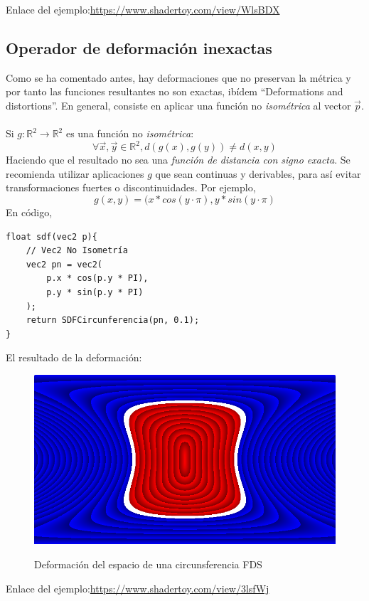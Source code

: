 Enlace del ejemplo:\url{https://www.shadertoy.com/view/WlsBDX}

\subsection{Operador de deformación inexactas}
Como se ha comentado antes, hay deformaciones que no preservan la métrica y por tanto las funciones resultantes no son exactas, ibídem \enquote{Deformations and distortions}. En general, consiste en aplicar una función no \textit{isométrica} al vector \(\Vec{p}\).\\\\
Si \(g:\mathbb{R}^2\longrightarrow \mathbb{R}^2\) es una función no \textit{isométrica}:
\[ \forall \Vec{x}, \Vec{y} \in \mathbb{R}^2, d(g(x), g(y)) \neq d(x,y) \]
Haciendo que el resultado no sea una \textit{función de distancia con signo exacta}. Se recomienda utilizar aplicaciones \(g\) que sean continuas y derivables, para así evitar transformaciones fuertes o discontinuidades. Por ejemplo,
\[g(x,y)=(x * cos(y \cdot \pi), y * sin(y \cdot \pi)\]
En código,
\begin{lstlisting}
float sdf(vec2 p){
	// Vec2 No Isometría
	vec2 pn = vec2(
	    p.x * cos(p.y * PI),
	    p.y * sin(p.y * PI)
	);
	return SDFCircunferencia(pn, 0.1);
}
\end{lstlisting}
El resultado de la deformación:
\begin{figure}[H]
  \centering
  \captionsetup{justification=centering}%
  \includegraphics[width=1.0\textwidth]{secciones/imagenes/sdf/2d/sdf_deform.png}\label{fig:deform}
  \caption{Deformación del espacio de una circunsferencia FDS}
\end{figure}

Enlace del ejemplo:\url{https://www.shadertoy.com/view/3lsfWj}

